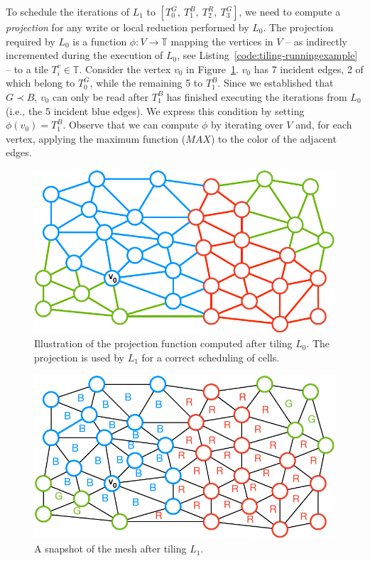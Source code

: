To schedule the iterations of $L_1$ to $[T_0^G,\ T_1^B,\ T_2^R,\ T_3^G]$, we need to compute a \textit{projection} for any write or local reduction performed by $L_0$. The projection required by $L_0$ is a function $\phi : V \rightarrow \mathbb{T}$ mapping the vertices in $V$ -- as indirectly incremented during the execution of $L_0$, see Listing~\ref{code:tiling-runningexample} -- to a tile $T_i^c \in \mathbb{T}$. Consider the vertex $v_0$ in Figure~\ref{fig:st-loop-0-proj}. $v_0$ has 7 incident edges, 2 of which belong to $T_0^G$, while the remaining 5 to $T_1^B$. Since we established that $G \prec B$, $v_0$ can only be read after $T_1^B$ has finished executing the iterations from $L_0$ (i.e., the 5 incident blue edges). We express this condition by setting $\phi(v_0) = T_1^B$. Observe that we can compute $\phi$ by iterating over $V$ and, for each vertex, applying the maximum function ($MAX$) to the color of the adjacent edges. 

\begin{figure}
\centering
\includegraphics[scale=0.6]{sparsetiling/figures/loop_0_with_vertices.pdf}
\caption{Illustration of the projection function computed after tiling $L_0$. The projection is used by $L_1$ for a correct scheduling of cells.}
\label{fig:st-loop-0-proj}
\end{figure}

\begin{figure}
\centering
\includegraphics[scale=0.6]{sparsetiling/figures/loop_1.pdf}
\caption{A snapshot of the mesh after tiling $L_1$.}
\label{fig:st-loop-1}
\end{figure}

